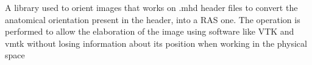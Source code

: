 \-A library used to orient images that works on .mhd header files to convert the anatomical orientation present in the header, into a \-R\-A\-S one. \-The operation is performed to allow the elaboration of the image using software like \-V\-T\-K and vmtk without losing information about its position when working in the physical space 